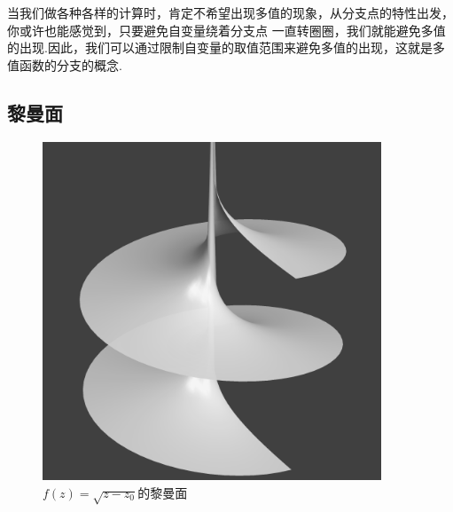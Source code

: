 \documentclass[12pt, a4paper]{ctexbook}
\begin{document}
                当我们做各种各样的计算时，肯定不希望出现多值的现象，从分支点的特性出发，你或许也能感觉到，只要避免自变量绕着分支点
                一直转圈圈，我们就能避免多值的出现.因此，我们可以通过限制自变量的取值范围来避免多值的出现，这就是多值函数的分支的概念.

            \subsection{黎曼面}
                \begin{figure}[htbp]
                    \centering
                    \begin{minipage}[t]{0.48\textwidth}
                        \centering
                        \includegraphics[width=0.9\textwidth]{RiemannSurface.png}
                        \caption{$f(z) = \sqrt{z - z_0}$的黎曼面}
                        \label{fig:riemann_surface}
                    \end{minipage}
                    \begin{minipage}[t]{0.48\textwidth}
                        \centering

\end{minipage}
\end{figure}
\end{document}
